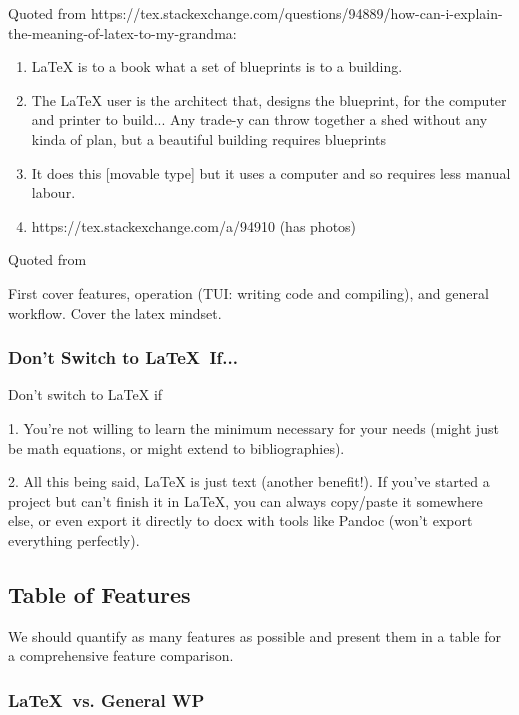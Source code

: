 \documentclass[12pt]{article}
\begin{document}
Quoted from https://tex.stackexchange.com/questions/94889/how-can-i-explain-the-meaning-of-latex-to-my-grandma:
\begin{enumerate}
  \item LaTeX is to a book what a set of blueprints is to a building.
  \item The LaTeX user is the architect that, designs the blueprint, for the computer and printer to build... Any trade-y can throw together a shed without any kinda of plan, but a beautiful building requires blueprints
  \item It does this [movable type] but it uses a computer and so requires less manual labour.
  \item https://tex.stackexchange.com/a/94910 (has photos)\\
\end{enumerate}

Quoted from


\vspace{2cm}

First cover features, operation (TUI: writing code and compiling), and general workflow. Cover the latex mindset.

\subsubsection{Don't Switch to \LaTeX\ If...}%
\label{feat-comp.latex.don't-switch}

Don't switch to LaTeX if

1. You're not willing to learn the minimum necessary for your needs (might just be math equations, or might extend to bibliographies).

2. All this being said, LaTeX is just text (another benefit!). If you've started a project but can't finish it in LaTeX, you can always copy/paste it somewhere else, or even export it directly to docx with tools like Pandoc (won't export everything perfectly).

\subsection{Table of Features}%
\label{feat-comp.table}

We should quantify as many features as possible and present them in a table for a comprehensive feature comparison.

\subsubsection{\LaTeX\ vs. General WP}%
\label{feat-comp.table.latex-vs-wp}
\end{document}
